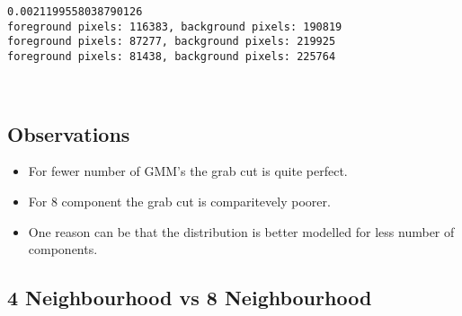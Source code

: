 \documentclass[11pt]{article}
\providecommand{\tightlist}{%
      \setlength{\itemsep}{0pt}\setlength{\parskip}{0pt}}
\begin{document}
    \begin{Verbatim}[commandchars=\\\{\}]
0.0021199558038790126
foreground pixels: 116383, background pixels: 190819
foreground pixels: 87277, background pixels: 219925
foreground pixels: 81438, background pixels: 225764

    \end{Verbatim}

    \begin{center}
    \end{center}
    { \hspace*{\fill} \\}
    
    \hypertarget{observations}{%
\subsection{Observations}\label{observations}}

\begin{itemize}
\tightlist
\item
  For fewer number of GMM's the grab cut is quite perfect.
\item
  For 8 component the grab cut is comparitevely poorer.
\item
  One reason can be that the distribution is better modelled for less
  number of components.
\end{itemize}

    \hypertarget{neighbourhood-vs-8-neighbourhood}{%
\subsection{4 Neighbourhood vs 8
Neighbourhood}\label{neighbourhood-vs-8-neighbourhood}}
\end{document}
